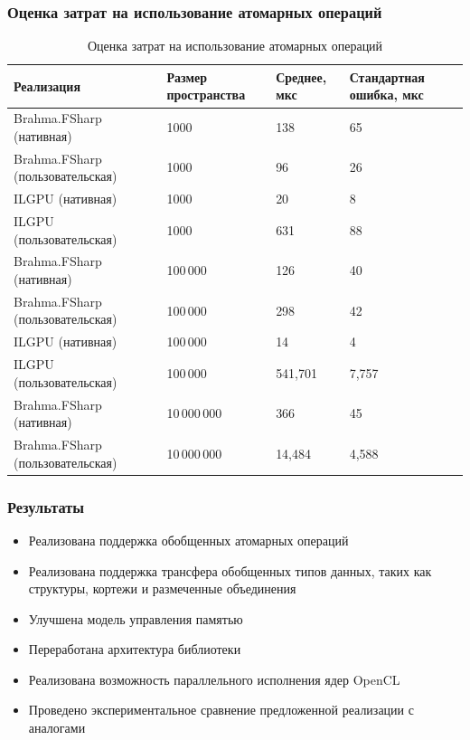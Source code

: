 \documentclass[aspectratio=169]{beamer}
\begin{document}
\begin{frame}
    \frametitle{Оценка затрат на использование атомарных операций}
   \begin{table}
    \begin{tabularx}{\textwidth}{|l|X|X|X|}
      \hline
      \textbf{Реализация} & \textbf{Размер пространства} & \textbf{Среднее, мкс} & \textbf{Стандартная ошибка, мкс} \\
      \hline
      Brahma.FSharp (нативная) & 1000 & 138 & 65  \\
      Brahma.FSharp (пользовательская) & 1000 & 96 & 26  \\
      ILGPU (нативная) & 1000 & 20 & 8   \\
      ILGPU (пользовательская) & 1000 & 631 & 88  \\
      \hline
      Brahma.FSharp (нативная) & 100\,000 & 126   & 40  \\
      Brahma.FSharp (пользовательская) & 100\,000 & 298   & 42  \\
      ILGPU (нативная) & 100\,000 & 14  & 4 \\
      ILGPU (пользовательская) & 100\,000 & 541,701   & 7,757 \\
      \hline
      Brahma.FSharp (нативная) & 10\,000\,000 & 366 & 45    \\
      Brahma.FSharp (пользовательская) & 10\,000\,000 & 14,484  & 4,588    \\
      \hline
    \end{tabularx}
  \caption{Оценка затрат на использование атомарных операций}
  \label{tab:atom}
\end{table}
\end{frame}
             
\begin{frame}  
  \frametitle{Результаты}
  \begin{itemize}
\item Реализована поддержка обобщенных атомарных операций
\item Реализована поддержка трансфера обобщенных типов данных, таких как структуры, кортежи и размеченные объединения
\item Улучшена модель управления памятью
\item Переработана архитектура библиотеки
\item Реализована возможность параллельного исполнения ядер OpenCL
\item Проведено экспериментальное сравнение предложенной реализации с аналогами
\end{itemize}
\end{frame}         
\end{document}
